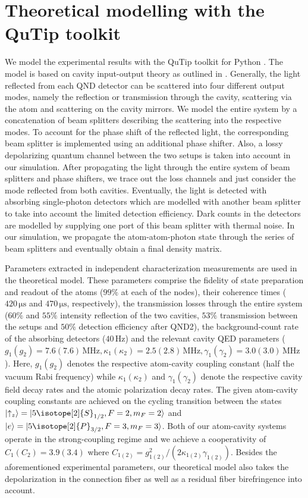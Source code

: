 \documentclass[prl,twocolumn,amsmath,amssymb,bibnotes,aps,longbibliography]{revtex4-1}
\newcommand{\ket}[1]{|{#1}\rangle}
\begin{document}
\section{Theoretical modelling with the QuTip toolkit}
\noindent We model the experimental results with the QuTip toolkit for Python \cite{johansson2012}. The model is based on cavity input-output theory as outlined in \cite{kuhn2015}. Generally, the light reflected from each QND detector can be scattered into four different output modes, namely the reflection or transmission through the cavity, scattering via the atom and scattering on the cavity mirrors. We model the entire system by a concatenation of beam splitters describing the scattering into the respective modes. To account for the phase shift of the reflected light, the corresponding beam splitter is implemented using an additional phase shifter. Also, a lossy depolarizing quantum channel between the two setups is taken into account in our simulation. After propagating the light through the entire system of beam splitters and phase shifters, we trace out the loss channels and just consider the mode reflected from both cavities. Eventually, the light is detected with absorbing single-photon detectors which are modelled with another beam splitter to take into account the limited detection efficiency. Dark counts in the detectors are modelled by supplying one port of this beam splitter with thermal noise. In our simulation, we propagate the atom-atom-photon state through the series of beam splitters and eventually obtain a final density matrix.

Parameters extracted in independent characterization measurements are used in the theoretical model. These parameters comprise the fidelity of state preparation and readout of the atoms ($99\%$ at each of the nodes), their coherence times ($420\,\mathrm{\mu s}$ and $470\,\mathrm{\mu s}$, respectively), the transmission losses through the entire system ($60\%$ and $55\%$ intensity reflection of the two cavities, $53\%$ transmission between the setups and $50\%$ detection efficiency after QND2), the background-count rate of the absorbing detectors ($40\,\mathrm{Hz}$) and the relevant cavity QED parameters ($g_1(g_2)=7.6(7.6)\,\mathrm{MHz},\kappa_1(\kappa_2)=2.5(2.8)\,\mathrm{MHz},\gamma_1(\gamma_2)=3.0(3.0)\,\mathrm{MHz}$). Here, $g_{1}(g_{2})$ denotes the respective atom-cavity coupling constant (half the vacuum Rabi frequency) while $\kappa_{1}(\kappa_{2})$ and $\gamma_{1}(\gamma_{2})$ denote the respective cavity field decay rates and the atomic polarization decay rates. The given atom-cavity coupling constants are achieved on the cycling transition between the states $\ket{\uparrow_z}=\ket{5\isotope[2]{S}_{1/2}, F=2, m_F=2}$ and 
$\ket{e}=\ket{5\isotope[2]{P}_{3/2}, F=3, m_F=3}$. Both of our atom-cavity systems operate in the strong-coupling regime and we achieve a cooperativity of $C_1(C_2)=3.9(3.4)$ where $C_{1(2)}=g_{1(2)}^2/(2\kappa_{1(2)}\gamma_{1(2)})$. Besides the aforementioned experimental parameters, our theoretical model also takes the depolarization in the connection fiber as well as a residual fiber birefringence into account. 
\end{document}
